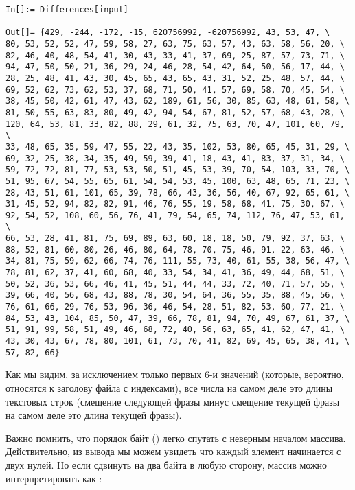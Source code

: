 \begin{lstlisting}[style=custommath]
In[]:= Differences[input]

Out[]= {429, -244, -172, -15, 620756992, -620756992, 43, 53, 47, \
80, 53, 52, 52, 47, 59, 58, 27, 63, 75, 63, 57, 43, 63, 58, 56, 20, \
82, 46, 40, 48, 54, 41, 30, 43, 33, 41, 37, 69, 25, 87, 57, 73, 71, \
94, 47, 50, 50, 21, 36, 29, 24, 46, 28, 54, 42, 64, 50, 56, 17, 44, \
28, 25, 48, 41, 43, 30, 45, 65, 43, 65, 43, 31, 52, 25, 48, 57, 44, \
69, 52, 62, 73, 62, 53, 37, 68, 71, 50, 41, 57, 69, 58, 70, 45, 54, \
38, 45, 50, 42, 61, 47, 43, 62, 189, 61, 56, 30, 85, 63, 48, 61, 58, \
81, 50, 55, 63, 83, 80, 49, 42, 94, 54, 67, 81, 52, 57, 68, 43, 28, \
120, 64, 53, 81, 33, 82, 88, 29, 61, 32, 75, 63, 70, 47, 101, 60, 79, \
33, 48, 65, 35, 59, 47, 55, 22, 43, 35, 102, 53, 80, 65, 45, 31, 29, \
69, 32, 25, 38, 34, 35, 49, 59, 39, 41, 18, 43, 41, 83, 37, 31, 34, \
59, 72, 72, 81, 77, 53, 53, 50, 51, 45, 53, 39, 70, 54, 103, 33, 70, \
51, 95, 67, 54, 55, 65, 61, 54, 54, 53, 45, 100, 63, 48, 65, 71, 23, \
28, 43, 51, 61, 101, 65, 39, 78, 66, 43, 36, 56, 40, 67, 92, 65, 61, \
31, 45, 52, 94, 82, 82, 91, 46, 76, 55, 19, 58, 68, 41, 75, 30, 67, \
92, 54, 52, 108, 60, 56, 76, 41, 79, 54, 65, 74, 112, 76, 47, 53, 61, \
66, 53, 28, 41, 81, 75, 69, 89, 63, 60, 18, 18, 50, 79, 92, 37, 63, \
88, 52, 81, 60, 80, 26, 46, 80, 64, 78, 70, 75, 46, 91, 22, 63, 46, \
34, 81, 75, 59, 62, 66, 74, 76, 111, 55, 73, 40, 61, 55, 38, 56, 47, \
78, 81, 62, 37, 41, 60, 68, 40, 33, 54, 34, 41, 36, 49, 44, 68, 51, \
50, 52, 36, 53, 66, 46, 41, 45, 51, 44, 44, 33, 72, 40, 71, 57, 55, \
39, 66, 40, 56, 68, 43, 88, 78, 30, 54, 64, 36, 55, 35, 88, 45, 56, \
76, 61, 66, 29, 76, 53, 96, 36, 46, 54, 28, 51, 82, 53, 60, 77, 21, \
84, 53, 43, 104, 85, 50, 47, 39, 66, 78, 81, 94, 70, 49, 67, 61, 37, \
51, 91, 99, 58, 51, 49, 46, 68, 72, 40, 56, 63, 65, 41, 62, 47, 41, \
43, 30, 43, 67, 78, 80, 101, 61, 73, 70, 41, 82, 69, 45, 65, 38, 41, \
57, 82, 66}
\end{lstlisting}

Как мы видим, за исключением только первых 6-и значений
(которые, вероятно, относятся к заголову файла с индексами),
все числа на самом деле это длины текстовых строк
(смещение следующей фразы минус смещение текущей фразы на самом деле это длина текущей фразы).

Важно помнить, что порядок байт (\IT{endiannes}) легко спутать с неверным началом массива.
Действительно, из вывода \IT{od} мы можем увидеть что каждый элемент начинается с двух нулей.
Но если сдвинуть на два байта в любую сторону, массив можно интерпретировать как :

